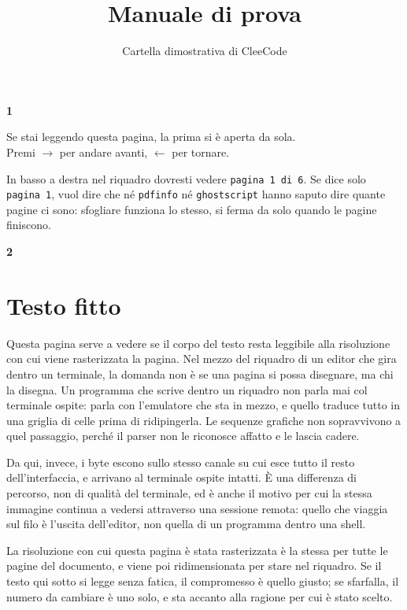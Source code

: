 \documentclass[12pt,a4paper]{article}
\title{Manuale di prova}
\author{Cartella dimostrativa di CleeCode}
\date{}
\newcommand{\numerone}[1]{%
  {\centering\fontsize{90}{90}\selectfont\bfseries\textcolor{gray!30}{#1}\par}%
  \vspace{0.5em}%
}
\begin{document}
\maketitle
\thispagestyle{empty}
\numerone{1}
\begin{center}
\Large Se stai leggendo questa pagina, la prima si è aperta da sola.\\[1em]
\large Premi $\rightarrow$ per andare avanti, $\leftarrow$ per tornare.
\end{center}
\vfill
\noindent In basso a destra nel riquadro dovresti vedere \texttt{pagina 1 di 6}.
Se dice solo \texttt{pagina 1}, vuol dire che né \texttt{pdfinfo} né
\texttt{ghostscript} hanno saputo dire quante pagine ci sono: sfogliare funziona
lo stesso, si ferma da solo quando le pagine finiscono.
\newpage

\numerone{2}
\section{Testo fitto}
Questa pagina serve a vedere se il corpo del testo resta leggibile alla
risoluzione con cui viene rasterizzata la pagina.
Nel mezzo del riquadro di un editor che gira dentro un terminale, la domanda
non è se una pagina si possa disegnare, ma chi la disegna. Un programma che
scrive dentro un riquadro non parla mai col terminale ospite: parla con
l'emulatore che sta in mezzo, e quello traduce tutto in una griglia di celle
prima di ridipingerla. Le sequenze grafiche non sopravvivono a quel passaggio,
perché il parser non le riconosce affatto e le lascia cadere.

Da qui, invece, i byte escono sullo stesso canale su cui esce tutto il resto
dell'interfaccia, e arrivano al terminale ospite intatti. È una differenza di
percorso, non di qualità del terminale, ed è anche il motivo per cui la stessa
immagine continua a vedersi attraverso una sessione remota: quello che viaggia
sul filo è l'uscita dell'editor, non quella di un programma dentro una shell.

La risoluzione con cui questa pagina è stata rasterizzata è la stessa per tutte
le pagine del documento, e viene poi ridimensionata per stare nel riquadro. Se
il testo qui sotto si legge senza fatica, il compromesso è quello giusto; se
sfarfalla, il numero da cambiare è uno solo, e sta accanto alla ragione per cui
è stato scelto.
\newpage
\end{document}
